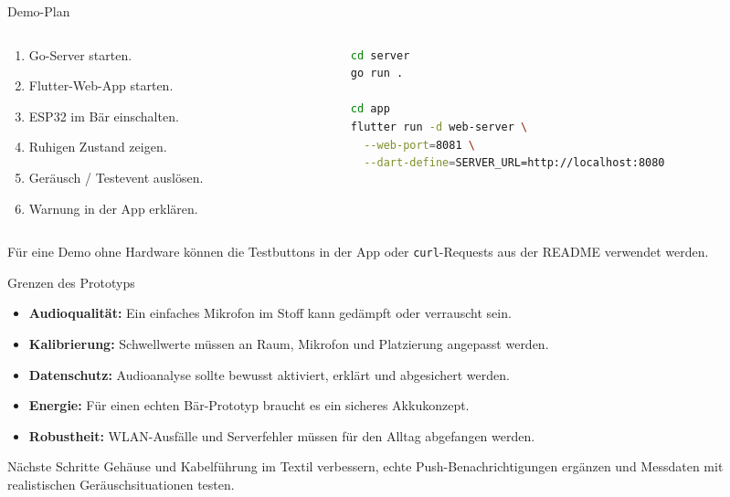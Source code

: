 \documentclass[aspectratio=169,11pt]{beamer}
\begin{document}
\begin{frame}[fragile]{Demo-Plan}
  \begin{columns}[T,totalwidth=\textwidth]
    \begin{column}{0.52\textwidth}
      \begin{enumerate}
        \item Go-Server starten.
        \item Flutter-Web-App starten.
        \item ESP32 im Bär einschalten.
        \item Ruhigen Zustand zeigen.
        \item Geräusch / Testevent auslösen.
        \item Warnung in der App erklären.
      \end{enumerate}
    \end{column}
    \begin{column}{0.43\textwidth}
\begin{lstlisting}[language=bash,basicstyle=\ttfamily\tiny]
cd server
go run .

cd app
flutter run -d web-server \
  --web-port=8081 \
  --dart-define=SERVER_URL=http://localhost:8080
\end{lstlisting}
    \end{column}
  \end{columns}

  \vspace{0.5em}
  \small
  Für eine Demo ohne Hardware können die Testbuttons in der App oder
  \texttt{curl}-Requests aus der README verwendet werden.
\end{frame}

\begin{frame}{Grenzen des Prototyps}
  \begin{itemize}
    \item \textbf{Audioqualität:} Ein einfaches Mikrofon im Stoff kann gedämpft oder verrauscht sein.
    \item \textbf{Kalibrierung:} Schwellwerte müssen an Raum, Mikrofon und Platzierung angepasst werden.
    \item \textbf{Datenschutz:} Audioanalyse sollte bewusst aktiviert, erklärt und abgesichert werden.
    \item \textbf{Energie:} Für einen echten Bär-Prototyp braucht es ein sicheres Akkukonzept.
    \item \textbf{Robustheit:} WLAN-Ausfälle und Serverfehler müssen für den Alltag abgefangen werden.
  \end{itemize}

  \vspace{0.9em}
  \begin{block}{Nächste Schritte}
    Gehäuse und Kabelführung im Textil verbessern, echte Push-Benachrichtigungen
    ergänzen und Messdaten mit realistischen Geräuschsituationen testen.
  \end{block}
\end{frame}
\end{document}
